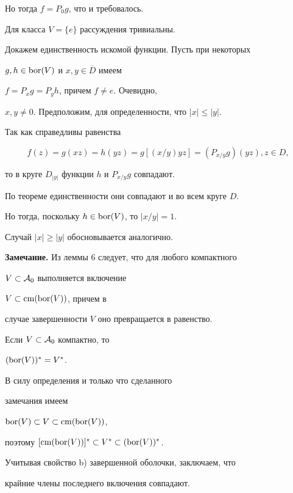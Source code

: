 \begin{pf}
Но тогда $f= P_0 g$, что и требовалось.


Для класса $V= \{ e \}$ рассуждения тривиальны.





Докажем единственность искомой функции. Пусть при некоторых


$g, h\in \operatorname{bor}(V)$ и $x,y\in \overline{D}$ имеем 


$f = P_x g = P_y h$, причем $f \neq e$. Очевидно,


$x,y \neq 0$. Предположим, для определенности, что $|x| \le |y|$. 


Так как справедливы равенства


$$


f(z)= g(xz)= h(yz)= g[(x/y)yz]= (P_{x/y} g)(yz), z \in D,


$$


то в круге $D_{|y|}$ функции $h$ и $P_{x/y} g$ совпадают. 


По теореме единственности они совпадают и во всем круге $D$. 


Но тогда, поскольку $h \in \operatorname{bor}(V)$, то $|x/y| = 1$. 


Случай $|x| \ge |y|$ обосновывается аналогично.


\end{pf}





{\bf Замечание.} Из леммы 6 следует, что для любого компактного


$V\subset{\cal A}_0$ выполняется включение 


$V \subset \operatorname{cm} (\operatorname{bor}(V))$, причем в


случае завершенности $V$ оно превращается в равенство.





\begin{cor}


Если $V\subset{\cal A}_0$ компактно, то 


$(\operatorname{bor}(V))^* =V^*$.


\end{cor}





\begin{pf}


В силу определения и только что сделанного


замечания имеем


$\operatorname{bor}(V) \subset V \subset \operatorname{cm} (\operatorname{bor}(V))$, 


поэтому $[\cm (\bor(V))]^* \subset V^* \subset 


(\bor(V))^*$. 


Учитывая свойство b) завершенной оболочки, заключаем, что 


крайние члены последнего включения совпадают.


\end{pf}





